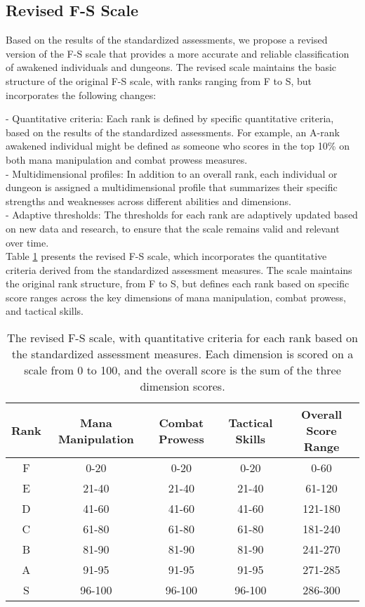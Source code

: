 \documentclass[12pt, a4paper]{article}
\begin{document}
\subsection{Revised F-S Scale}

Based on the results of the standardized assessments, we propose a revised version of the F-S scale that provides a more accurate and reliable classification of awakened individuals and dungeons. The revised scale maintains the basic structure of the original F-S scale, with ranks ranging from F to S, but incorporates the following changes:

- Quantitative criteria: Each rank is defined by specific quantitative criteria, based on the results of the standardized assessments. For example, an A-rank awakened individual might be defined as someone who scores in the top 10\% on both mana manipulation and combat prowess measures.\\
- Multidimensional profiles: In addition to an overall rank, each individual or dungeon is assigned a multidimensional profile that summarizes their specific strengths and weaknesses across different abilities and dimensions.\\
- Adaptive thresholds: The thresholds for each rank are adaptively updated based on new data and research, to ensure that the scale remains valid and relevant over time.\\

Table \ref{fig:scale} presents the revised F-S scale, which incorporates the quantitative criteria derived from the standardized assessment measures. The scale maintains the original rank structure, from F to S, but defines each rank based on specific score ranges across the key dimensions of mana manipulation, combat prowess, and tactical skills.

\begin{table}[ht]
\centering
\begin{tabular}{ccccc}
\hline
\textbf{Rank} & \textbf{Mana Manipulation} & \textbf{Combat Prowess} & \textbf{Tactical Skills} & \textbf{Overall Score Range} \\
\hline
F & 0-20 & 0-20 & 0-20 & 0-60 \\
E & 21-40 & 21-40 & 21-40 & 61-120 \\
D & 41-60 & 41-60 & 41-60 & 121-180 \\
C & 61-80 & 61-80 & 61-80 & 181-240 \\
B & 81-90 & 81-90 & 81-90 & 241-270 \\
A & 91-95 & 91-95 & 91-95 & 271-285 \\
S & 96-100 & 96-100 & 96-100 & 286-300 \\
\hline
\end{tabular}
\caption{The revised F-S scale, with quantitative criteria for each rank based on the standardized assessment measures. Each dimension is scored on a scale from 0 to 100, and the overall score is the sum of the three dimension scores.}
\label{fig:scale}
\end{table}
\end{document}
